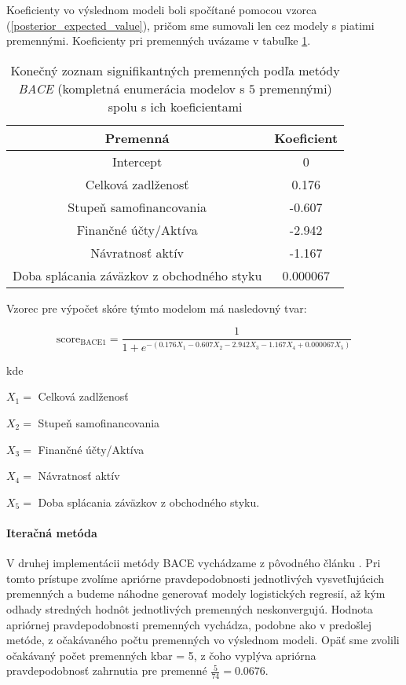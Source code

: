 Koeficienty vo výslednom modeli boli spočítané pomocou vzorca (\ref{posterior_expected_value}), pričom sme sumovali len cez modely s piatimi premennými.
Koeficienty pri premenných uvázame v tabuľke \ref{bace1 tabulka konecne parametre}.

\begin{table}
    \begin{tabular}{ |c|c| }
        \hline
        Premenná & Koeficient \\
        \hline
        Intercept & 0 \\
        \hline
        Celková zadlženosť & 0.176 \\
        \hline
        Stupeň samofinancovania & -0.607 \\
        \hline
        Finančné účty/Aktíva & -2.942 \\
        \hline
        Návratnosť aktív & -1.167 \\
        \hline
        Doba splácania záväzkov z obchodného styku & 0.000067 \\
        \hline
    \end{tabular}
    \caption{Konečný zoznam signifikantných premenných podľa metódy \emph{BACE} (kompletná enumerácia modelov s \(5\) premennými) spolu s ich koeficientami}
    \label{bace1 tabulka konecne parametre}
\end{table}

Vzorec pre výpočet skóre týmto modelom má nasledovný tvar:

\[
    \text{score}_\text{BACE1} = \frac{1}{1 + e^{-(0.176X_1 - 0.607X_2 - 2.942X_3 - 1.167X_4 + 0.000067X_5)}}
\]

kde

\(X_1 = \) Celková zadlženosť

\(X_2 = \) Stupeň samofinancovania

\(X_3 = \) Finančné účty/Aktíva

\(X_4 = \) Návratnosť aktív

\(X_5 = \) Doba splácania záväzkov z obchodného styku.

\paragraph{Iteračná metóda}

V druhej implementácii metódy BACE vychádzame z pôvodného článku \cite{sala-i-martin}.
Pri tomto prístupe zvolíme apriórne pravdepodobnosti jednotlivých vysvetľujúcich premenných a budeme náhodne generovať modely logistických regresií,
až kým odhady stredných hodnôt jednotlivých premenných neskonvergujú.
Hodnota apriórnej pravdepodobnosti premenných vychádza, podobne ako v predošlej metóde, z očakávaného počtu premenných vo výslednom modeli.
Opäť sme zvolili očakávaný počet premenných kbar = 5, z čoho vyplýva apriórna pravdepodobnosť zahrnutia pre premenné \( \frac{5}{74} = 0.0676 \).

